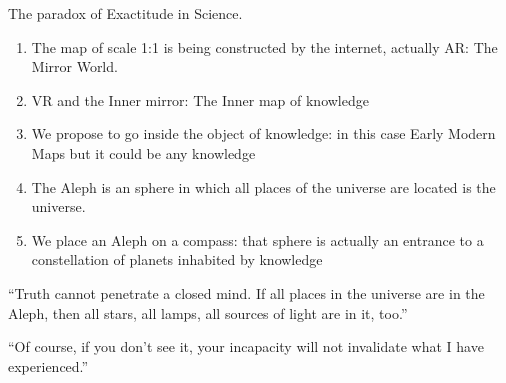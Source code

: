 \documentclass{beamer}
\begin{document}
\begin{frame}{The paradox of Exactitude in Science.}
	\begin{enumerate}
		\item The map of scale 1:1 is being constructed by the internet, 
			actually AR: The Mirror World.
		\item VR and the Inner mirror: The Inner map of knowledge
		\item We propose to go inside the object of knowledge: in this case Early Modern Maps but it could be any knowledge
		\item The Aleph is an sphere in which all places of the universe are located is the universe.
		\item We place an Aleph on a compass:  that sphere is actually an entrance to a constellation of planets inhabited by knowledge
	\end{enumerate}
\end{frame}
\begin{frame}
	``Truth cannot penetrate a closed mind. If all places in the universe are in the Aleph, then all stars, all lamps, all sources of light are in it, too.''\par

	``Of course, if you don't see it, your incapacity will not invalidate what I have experienced.''
\end{frame}
\end{document}
